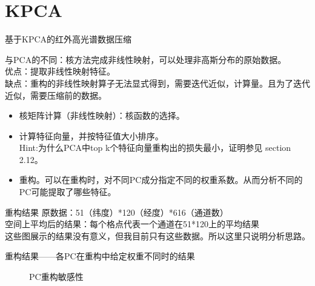 \documentclass[aspectratio=43]{beamer}
\begin{document}
\section{KPCA}
\begin{frame}{基于KPCA的红外高光谱数据压缩}
\begin{card}
与PCA的不同：核方法完成非线性映射，可以处理非高斯分布的原始数据。\\
优点：提取非线性映射特征。\\
缺点：重构的非线性映射算子无法显式得到，需要迭代近似，计算量。且为了迭代近似，需要压缩前的数据。
\end{card}
\begin{cardTiny}[步骤]
\begin{itemize}
\item 核矩阵计算（非线性映射）：{\color{green}核函数的选择}。
\item 计算特征向量，并按特征值大小排序。\\{\color{primary}Hint:为什么PCA中top k个特征向量重构出的损失最小，证明参见 section 2.12\cite{Goodfellow2016Deep}。}
\item 重构。可以在重构时，对不同PC成分指定不同的权重系数。从而分析不同的PC可能提取了哪些特征。
\end{itemize}
\end{cardTiny}
\end{frame}


\begin{frame}{重构结果\cite{Wang2012Kernel,Mika1999Kernel}}
\centering
{}
原数据：51（纬度）*120（经度）*616（通道数）\\
空间上平均后的结果：每个格点代表一个通道在51*120上的平均结果\\
{\color{green}这些图展示的结果没有意义，但我目前只有这些数据。所以这里只说明分析思路。}
\end{frame}

\begin{frame}{重构结果——各PC在重构中给定权重不同时的结果}
\begin{figure}
  \centering
  \caption{PC重构敏感性}
\end{figure}
\end{frame}
\end{document}
